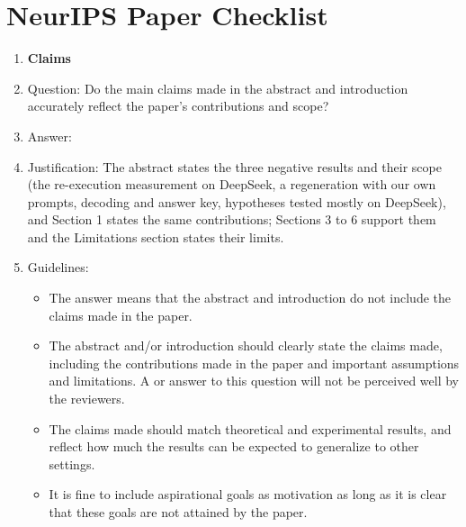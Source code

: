 \section*{NeurIPS Paper Checklist}




\begin{enumerate}

\item {\bf Claims}
    \item[] Question: Do the main claims made in the abstract and introduction accurately reflect the paper's contributions and scope?
    \item[] Answer: \answerYes{}
    \item[] Justification: The abstract states the three negative results and their scope (the re-execution measurement on DeepSeek, a regeneration with our own prompts, decoding and answer key, hypotheses tested mostly on DeepSeek), and Section 1 states the same contributions; Sections 3 to 6 support them and the Limitations section states their limits.
    \item[] Guidelines:
    \begin{itemize}
        \item The answer \answerNA{} means that the abstract and introduction do not include the claims made in the paper.
        \item The abstract and/or introduction should clearly state the claims made, including the contributions made in the paper and important assumptions and limitations. A \answerNo{} or \answerNA{} answer to this question will not be perceived well by the reviewers. 
        \item The claims made should match theoretical and experimental results, and reflect how much the results can be expected to generalize to other settings. 
        \item It is fine to include aspirational goals as motivation as long as it is clear that these goals are not attained by the paper. 
    \end{itemize}


\end{enumerate}
